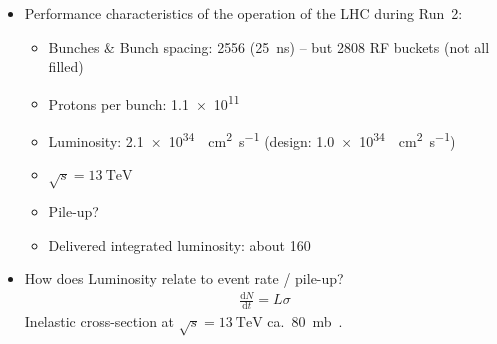 \begin{itemize}
\item Performance characteristics of the \pp operation of the LHC during Run~2:
  \begin{itemize}
  \item Bunches \& Bunch spacing: 2556 (\SI{25}{\nano\second}) -- but 2808 RF
    buckets (not all filled)
  \item Protons per bunch: \num{1.1e11}
  \item Luminosity: \SI{2.1e34}{\per\centi\metre\squared\per\second} (design:
    \SI{1.0e34}{\per\centi\metre\squared\per\second})
  \item $\sqrt{s} = \SI{13}{\TeV}$
  \item Pile-up?
  \item Delivered integrated luminosity: about \SI{160}{\ifb}
  \end{itemize}

\item How does Luminosity relate to event rate / pile-up?
  \begin{align*}
    \frac{\mathrm{d}N}{\mathrm{d}t} = L \sigma
  \end{align*}
  Inelastic \pp cross-section at $\sqrt{s} = \SI{13}{\TeV}$ ca.\
  \SI{80}{\milli\barn}~\cite{STDM-2015-05}.

\end{itemize}


